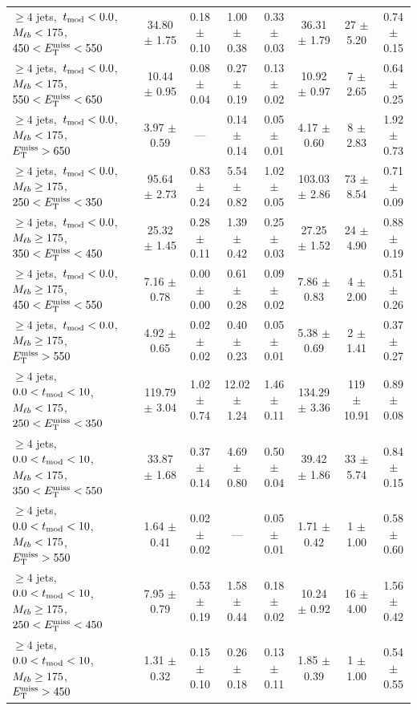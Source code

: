 \begin{table}
{\begin{tabular}{|l|c c c c c|c|c|}
$\ge4$ jets,~$t_\text{mod} <0.0$,~$M_{\ell b}<175$,~$450<E_\text{T}^\text{miss}<550$  & 34.80 $\pm$ 1.75  & 0.18 $\pm$ 0.10  & 1.00 $\pm$ 0.38  & 0.33 $\pm$ 0.03  & 36.31 $\pm$ 1.79  & 27 $\pm$ 5.20  & 0.74 $\pm$ 0.15 \\*
$\ge4$ jets,~$t_\text{mod} <0.0$,~$M_{\ell b}<175$,~$550<E_\text{T}^\text{miss}<650$  & 10.44 $\pm$ 0.95  & 0.08 $\pm$ 0.04  & 0.27 $\pm$ 0.19  & 0.13 $\pm$ 0.02  & 10.92 $\pm$ 0.97  & 7 $\pm$ 2.65  & 0.64 $\pm$ 0.25 \\*
$\ge4$ jets,~$t_\text{mod} <0.0$,~$M_{\ell b}<175$,~$E_\text{T}^\text{miss}>650$  & 3.97 $\pm$ 0.59  & ---  & 0.14 $\pm$ 0.14  & 0.05 $\pm$ 0.01  & 4.17 $\pm$ 0.60  & 8 $\pm$ 2.83  & 1.92 $\pm$ 0.73 \\*
\hline
$\ge4$ jets,~$t_\text{mod} <0.0$,~$M_{\ell b}\ge175$,~$250<E_\text{T}^\text{miss}<350$  & 95.64 $\pm$ 2.73  & 0.83 $\pm$ 0.24  & 5.54 $\pm$ 0.82  & 1.02 $\pm$ 0.05  & 103.03 $\pm$ 2.86  & 73 $\pm$ 8.54  & 0.71 $\pm$ 0.09 \\*
$\ge4$ jets,~$t_\text{mod} <0.0$,~$M_{\ell b}\ge175$,~$350<E_\text{T}^\text{miss}<450$  & 25.32 $\pm$ 1.45  & 0.28 $\pm$ 0.11  & 1.39 $\pm$ 0.42  & 0.25 $\pm$ 0.03  & 27.25 $\pm$ 1.52  & 24 $\pm$ 4.90  & 0.88 $\pm$ 0.19 \\*
$\ge4$ jets,~$t_\text{mod} <0.0$,~$M_{\ell b}\ge175$,~$450<E_\text{T}^\text{miss}<550$  & 7.16 $\pm$ 0.78  & 0.00 $\pm$ 0.00  & 0.61 $\pm$ 0.28  & 0.09 $\pm$ 0.02  & 7.86 $\pm$ 0.83  & 4 $\pm$ 2.00  & 0.51 $\pm$ 0.26 \\*
$\ge4$ jets,~$t_\text{mod} <0.0$,~$M_{\ell b}\ge175$,~$E_\text{T}^\text{miss}>550$  & 4.92 $\pm$ 0.65  & 0.02 $\pm$ 0.02  & 0.40 $\pm$ 0.23  & 0.05 $\pm$ 0.01  & 5.38 $\pm$ 0.69  & 2 $\pm$ 1.41  & 0.37 $\pm$ 0.27 \\*
\hline
$\ge4$ jets,~$0.0< t_\text{mod} <10$,~$M_{\ell b}<175$,~$250<E_\text{T}^\text{miss}<350$  & 119.79 $\pm$ 3.04  & 1.02 $\pm$ 0.74  & 12.02 $\pm$ 1.24  & 1.46 $\pm$ 0.11  & 134.29 $\pm$ 3.36  & 119 $\pm$ 10.91  & 0.89 $\pm$ 0.08 \\*
$\ge4$ jets,~$0.0< t_\text{mod} <10$,~$M_{\ell b}<175$,~$350<E_\text{T}^\text{miss}<550$  & 33.87 $\pm$ 1.68  & 0.37 $\pm$ 0.14  & 4.69 $\pm$ 0.80  & 0.50 $\pm$ 0.04  & 39.42 $\pm$ 1.86  & 33 $\pm$ 5.74  & 0.84 $\pm$ 0.15 \\*
$\ge4$ jets,~$0.0< t_\text{mod} <10$,~$M_{\ell b}<175$,~$E_\text{T}^\text{miss}>550$  & 1.64 $\pm$ 0.41  & 0.02 $\pm$ 0.02  & ---  & 0.05 $\pm$ 0.01  & 1.71 $\pm$ 0.42  & 1 $\pm$ 1.00  & 0.58 $\pm$ 0.60 \\*
\hline
$\ge4$ jets,~$0.0< t_\text{mod} <10$,~$M_{\ell b}\ge175$,~$250<E_\text{T}^\text{miss}<450$  & 7.95 $\pm$ 0.79  & 0.53 $\pm$ 0.19  & 1.58 $\pm$ 0.44  & 0.18 $\pm$ 0.02  & 10.24 $\pm$ 0.92  & 16 $\pm$ 4.00  & 1.56 $\pm$ 0.42 \\*
$\ge4$ jets,~$0.0< t_\text{mod} <10$,~$M_{\ell b}\ge175$,~$E_\text{T}^\text{miss}>450$  & 1.31 $\pm$ 0.32  & 0.15 $\pm$ 0.10  & 0.26 $\pm$ 0.18  & 0.13 $\pm$ 0.11  & 1.85 $\pm$ 0.39  & 1 $\pm$ 1.00  & 0.54 $\pm$ 0.55 \\*

\end{tabular}}
\end{table}
